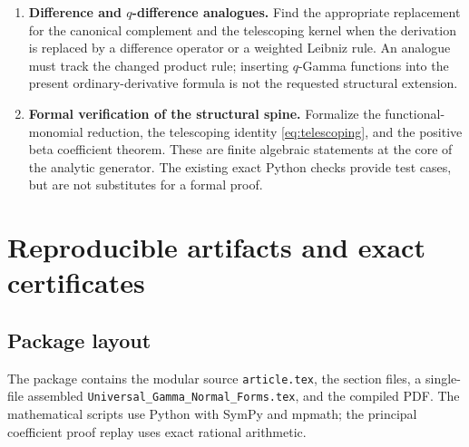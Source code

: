 \documentclass[11pt,letterpaper]{article}
\numberwithin{equation}{section}
\theoremstyle{plain}
\theoremstyle{definition}
\theoremstyle{remark}
\newcommand{\src}[1]{\nolinkurl{#1}}
\begin{document}
\begin{enumerate}[leftmargin=*,itemsep=7pt]
\item \textbf{Difference and $q$-difference analogues.}
Find the appropriate replacement for the canonical complement and the telescoping kernel when the derivation is replaced by a difference operator or a weighted Leibniz rule. An analogue must track the changed product rule; inserting $q$-Gamma functions into the present ordinary-derivative formula is not the requested structural extension.

\item \textbf{Formal verification of the structural spine.}
Formalize the functional-monomial reduction, the telescoping identity \eqref{eq:telescoping}, and the positive beta coefficient theorem. These are finite algebraic statements at the core of the analytic generator. The existing exact Python checks provide test cases, but are not substitutes for a formal proof.
\end{enumerate}


\appendix

\section{Reproducible artifacts and exact certificates}
\label{sec:replay}

\subsection{Package layout}

The package contains the modular source \src{article.tex}, the section files, a single-file assembled \src{Universal_Gamma_Normal_Forms.tex}, and the compiled PDF. The mathematical scripts use Python with SymPy and mpmath; the principal coefficient proof replay uses exact rational arithmetic.
\end{document}
